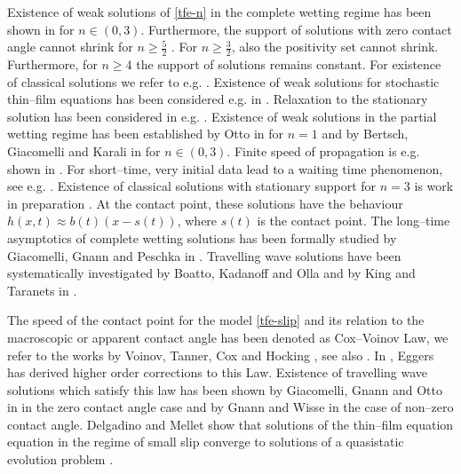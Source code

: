 \documentclass[pagesize,pdftex]{amsart}
\begin{document}
  \medskip

  Existence of weak solutions of \eqref{tfe-n} in the complete wetting regime
  has been shown in
  \cite{BernisFriedman-1990,BertozziPugh-1994,BerettaBertschDalpasso-1995,Gruen-2004-1}
  for $n\in (0,3)$. Furthermore, the support of solutions with zero contact
  angle cannot shrink for $n\geq \frac{5}{2}$
  \cite[eq. (0.5)]{BerettaBertschDalpasso-1995}. For $n\geq \frac 32$, also the
  positivity set cannot shrink. Furthermore, for $n\geq 4$ the support of
  solutions remains constant. For existence of classical solutions we refer to
  e.g. \cite{GiacomelliKnuepferOtto-2008,GiacomelliKnuepfer-2010,GiacomelliGnannKnuepferOtto-2014,Gnann-2015,GnannPetrache-2018,GessGnann-2020}. Existence
  of weak solutions for stochastic thin--film equations has been considered
  e.g. in \cite{FischerGruen-2018,GessGnann-2020,DareiotisEtal-2021}. Relaxation
  to the stationary solution has been considered in
  e.g. \cite{CarrilloToscani-2002,Esselborn-2016}. Existence of weak solutions
  in the partial wetting regime has been established by Otto in \cite{Otto-1998}
  for $n=1$ and by Bertsch, Giacomelli and Karali in
  \cite{BertschGiacomelliKarali-2005} for $n\in (0,3)$. Finite speed of
  propagation is e.g.  shown in
  \cite{Bernis-1996-1,Bernis-1996-2,HulshofShishkov-1998,Gruen-2003}. For
  short--time, very initial data lead to a waiting time phenomenon, see e.g.
  \cite{DalpassoGiacomelliGruen-2001,BloweyKingLangdon-2007,Shishkov2007,Fischer-2014}. Existence
  of classical solutions with stationary support for $n = 3$ is work in
  preparation \cite{GKV-preprint}. At the contact point, these solutions have
  the behaviour $h(x,t)\approx b(t)(x-s(t))$, where $s(t)$ is the contact point.
  The long--time asymptotics of complete wetting solutions has been formally
  studied by Giacomelli, Gnann and Peschka in
  \cite{GiacomelliGnannPeschka-2023}.  Travelling wave solutions have been
  systematically investigated by Boatto, Kadanoff and Olla
  \cite{BoattoEtal-1993,KingTaranets-2013} and by King and Taranets in
  \cite{KingTaranets-2013}.

  \medskip

  The speed of the contact point for the model \eqref{tfe-slip} and its
    relation to the macroscopic or apparent contact angle has been denoted as
    Cox--Voinov Law, we refer to the works by Voinov, Tanner, Cox and Hocking
    \cite{Voinov-1977,Tanner-1979, Cox-1986, Hocking-1992}, see also
    \cite{BonnEggersEtal-2009}. In \cite{Eggers-2004}, Eggers has derived higher
    order corrections to this Law. Existence of travelling wave solutions which
    satisfy this law has been shown by Giacomelli, Gnann and Otto in
    \cite{GiacomelliGnannOtto-2016} in the zero contact angle case and by Gnann
    and Wisse \cite{GnannWisse-2022} in the case of non--zero contact
    angle. Delgadino and Mellet show that solutions of the thin--film equation
    equation in the regime of small slip converge to solutions of a quasistatic
    evolution problem \cite{DelgadinoMellet-2021}.
\end{document}

